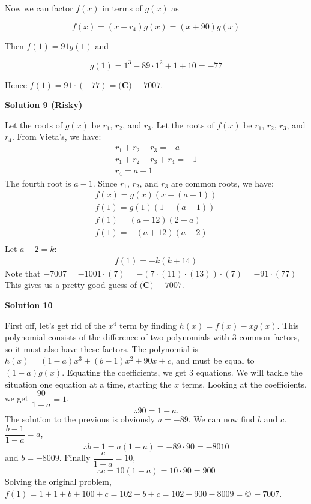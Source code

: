 \begin{enumerate}
 Now we can factor $f(x)$ in terms of $g(x)$ as

 
 \[f(x)=(x-r_4)g(x)=(x+90)g(x)\]

 Then $f(1)=91g(1)$ and

 
 \[g(1)=1^3-89\cdot 1^2+1+10=-77\]

 Hence $f(1)=91\cdot(-77)=\boxed{\textbf{(C)}\,-7007}$.

 



\textbf{Solution 9 (Risky)}

Let the roots of $g(x)$ be $r_1$, $r_2$, and $r_3$. Let the roots of $f(x)$ be $r_1$, $r_2$, $r_3$, and $r_4$. From Vieta's, we have:
 \begin{align*} r_1+r_2+r_3=-a \\ r_1+r_2+r_3+r_4=-1 \\ r_4=a-1 \end{align*}
The fourth root is $a-1$. Since $r_1$, $r_2$, and $r_3$ are common roots, we have:
 \begin{align*} f(x)=g(x)(x-(a-1)) \\ f(1)=g(1)(1-(a-1)) \\ f(1)=(a+12)(2-a) \\ f(1)=-(a+12)(a-2) \\ \end{align*}
Let $a-2=k$:
 \begin{align*} f(1)=-k(k+14) \end{align*}
Note that $-7007=-1001\cdot(7)=-(7\cdot(11)\cdot(13))\cdot(7)=-91\cdot(77)$This gives us a pretty good guess of $\boxed{\textbf{(C)}\, -7007}$.

 



\textbf{Solution 10}

First off, let's get rid of the $x^4$ term by finding $h(x)=f(x)-xg(x)$. This polynomial consists of the difference of two polynomials with $3$ common factors, so it must also have these factors. The polynomial is $h(x)=(1-a)x^3 + (b-1)x^2 + 90x + c$, and must be equal to $(1-a)g(x)$. Equating the coefficients, we get $3$ equations. We will tackle the situation one equation at a time, starting the $x$ terms. Looking at the coefficients, we get $\dfrac{90}{1-a} = 1$. 
 \[\therefore 90=1-a.\] The solution to the previous is obviously $a=-89$. We can now find $b$ and $c$. $\dfrac{b-1}{1-a} = a$, 
 \[\therefore b-1=a(1-a)=-89\cdot90=-8010\] and $b=-8009$. Finally $\dfrac{c}{1-a} = 10$, 
 \[\therefore c=10(1-a)=10\cdot90=900\] Solving the original problem, $f(1)=1 + 1 + b + 100 + c = 102+b+c=102+900-8009=\boxed{\textbf{©}\, -7007}$.


\end{enumerate}
